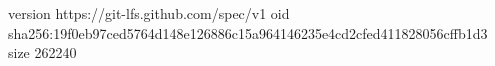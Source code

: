 version https://git-lfs.github.com/spec/v1
oid sha256:19f0eb97ced5764d148e126886c15a964146235e4cd2cfed411828056cffb1d3
size 262240
